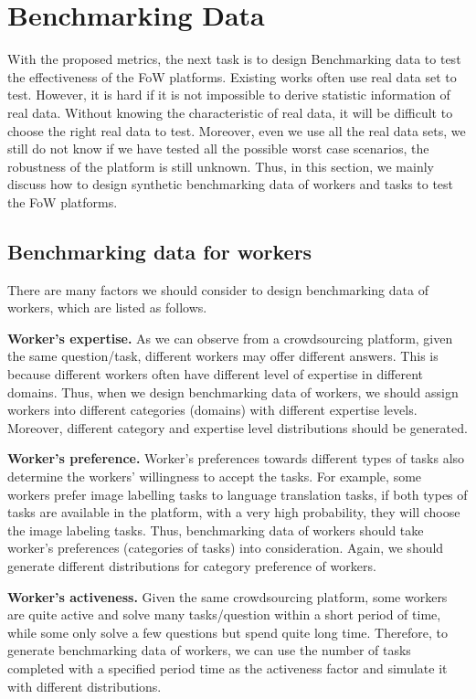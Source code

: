 \section{Benchmarking Data}
\label{sec:benchmarkingData}
With the proposed metrics, the next task is to design Benchmarking data to test the effectiveness of the FoW  platforms. Existing works \cite{yongxin2016online, ChengCY19, ChenCZC19} often use real data set to test. However, it is hard if it is not impossible to derive statistic information of real data. Without knowing the characteristic of real data, it will be difficult to choose the right real data to test. Moreover, even we use all the real data sets, we still do not know if we have tested all the possible worst case scenarios, the robustness of the platform is still unknown. Thus, in this section, we mainly discuss how to design synthetic benchmarking data of workers and tasks to test the FoW platforms.

\subsection{Benchmarking data for workers}

There are many factors we should consider to design benchmarking data of workers, which are listed as follows.

\textbf{Worker's expertise. } 
As we can observe from a crowdsourcing platform, given the same question/task,  different workers may offer different answers. This is because different workers often have different level of expertise in different domains. Thus, when we design benchmarking data of workers, we should assign  workers into different categories (domains) with different expertise levels. Moreover, different category and expertise level distributions should be generated.

\textbf{Worker's preference. } 
Worker's preferences towards different types of tasks also determine the workers' willingness to accept the tasks. For example, some workers prefer image labelling tasks to language translation tasks,  if both types of tasks are available in the platform, with a very high probability, they will choose the image labeling tasks. Thus, benchmarking data of workers should take worker's preferences (categories of tasks) into consideration. Again, we should generate different distributions for category preference of workers.

\textbf{Worker's activeness. } 
Given the same crowdsourcing platform, some workers are quite active and solve many tasks/question within a short period of time, while some only solve a few questions but spend quite long time. Therefore, to generate benchmarking data of workers, we can use  the number of tasks completed with a specified period time as the activeness factor and simulate it with different distributions.


